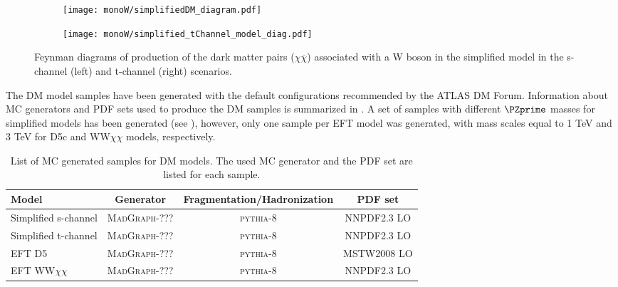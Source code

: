 \begin{figure}[]

\centering
\begin{subfigure}{.5\textwidth}
  \centering
  \texttt{[image: monoW/simplifiedDM\_diagram.pdf]}
\end{subfigure}%
\begin{subfigure}{.5\textwidth}
  \centering
  \texttt{[image: monoW/simplified\_tChannel\_model\_diag.pdf]}
\end{subfigure}
  \caption{Feynman diagrams of production of the dark matter pairs ($\chi\overline{\chi}$) associated with a W boson in the simplified model 
	   in the s-channel (left) and t-channel (right) scenarios.}
  \label{fig:feynMonoWSimple}
\end{figure}

The DM model samples have been generated with the default configurations recommended by the ATLAS DM Forum. Information about MC generators and PDF sets used to produce the DM samples is summarized in .
A set of samples with different $\PZprime$ masses for simplified models has been generated (see ),
however, only one sample per EFT model was generated, with mass scales equal to 1 TeV and 3 TeV for D5c and WW$\chi\chi$ models, respectively.

\begin{table}[ht]
  \begin{center}
    \begin{tabular}{l|c|c|c}

Model &  Generator & Fragmentation/Hadronization  & PDF set \\
\hline\hline
Simplified s-channel & M{\scshape ad}G{\scshape raph}-??? & {\scshape pythia-8} & NNPDF2.3 LO \\
Simplified t-channel & M{\scshape ad}G{\scshape raph}-??? & {\scshape pythia-8} & NNPDF2.3 LO \\
EFT D5 & M{\scshape ad}G{\scshape raph}-??? & {\scshape pythia-8} & MSTW2008 LO \\
EFT WW$\chi\chi$ & M{\scshape ad}G{\scshape raph}-??? & {\scshape pythia-8} & NNPDF2.3 LO \\

\end{tabular}
\end{center}
  \caption{List of MC generated samples for DM models. The used MC generator and the PDF set are listed for each sample.
  }
\label{tab:monoW_samples}
\end{table}

